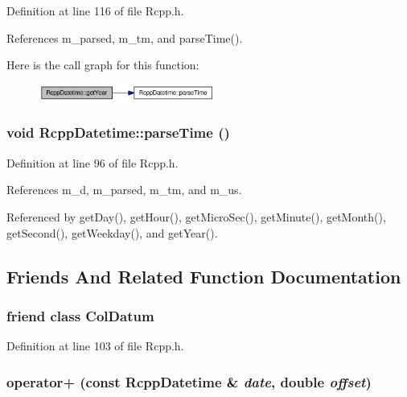 Definition at line 116 of file Rcpp.h.

References m\_\-parsed, m\_\-tm, and parseTime().

Here is the call graph for this function:\nopagebreak
\begin{figure}[H]
\begin{center}
\leavevmode
\includegraphics[width=164pt]{classRcppDatetime_ba930a8d7d575eb10444258a442027cf_cgraph}
\end{center}
\end{figure}
\hypertarget{classRcppDatetime_a4b2eba45c4c02b5d334dd89e080b660}{
\subsubsection[{parseTime}]{\setlength{\rightskip}{0pt plus 5cm}void RcppDatetime::parseTime ()}}
\label{classRcppDatetime_a4b2eba45c4c02b5d334dd89e080b660}




Definition at line 96 of file Rcpp.h.

References m\_\-d, m\_\-parsed, m\_\-tm, and m\_\-us.

Referenced by getDay(), getHour(), getMicroSec(), getMinute(), getMonth(), getSecond(), getWeekday(), and getYear().

\subsection{Friends And Related Function Documentation}
\hypertarget{classRcppDatetime_2740dcf7de2c2f5471d8fa18944a98d7}{
\subsubsection[{ColDatum}]{\setlength{\rightskip}{0pt plus 5cm}friend class {\bf ColDatum}}}
\label{classRcppDatetime_2740dcf7de2c2f5471d8fa18944a98d7}




Definition at line 103 of file Rcpp.h.\hypertarget{classRcppDatetime_29513e04f8cb90b2a7efea97f8cbd37a}{
\subsubsection[{operator+}]{ operator+ (const {\bf RcppDatetime} \& {\em date}, \/  double {\em offset})}}
\label{classRcppDatetime_29513e04f8cb90b2a7efea97f8cbd37a}




